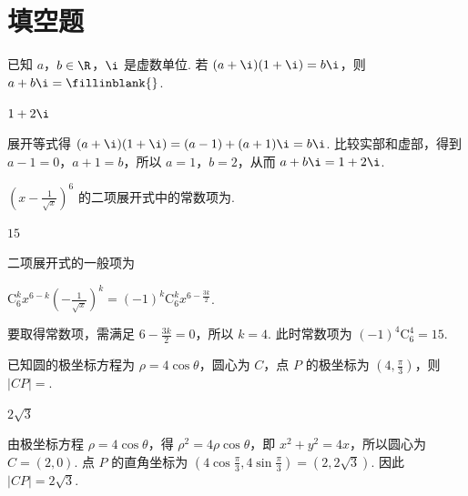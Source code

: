 \section{填空题}

\begin{problem}
已知 \(a\)，\(b\in\R\)，\(\i\) 是虚数单位. 若 \((a + \i)(1 + \i) = b\i\)，则 \(a + b\i =\fillinblank{}\).
\end{problem}

\begin{answer}
\(1+2\i\)
\end{answer}

\begin{solution}
展开等式得 \((a+\i)(1+\i)=(a-1)+(a+1)\i=b\i\). 比较实部和虚部，得到 \(a-1=0\)，\(a+1=b\)，所以 \(a=1\)，\(b=2\)，从而 \(a+b\i=1+2\i\).
\end{solution}

\begin{problem}
\(\left(x - \frac{1}{\sqrt{x}}\right)^6\) 的二项展开式中的常数项为\fillinblank{}.
\end{problem}

\begin{answer}
\(15\)
\end{answer}

\begin{solution}
二项展开式的一般项为

\(\mathrm C_6^k x^{6-k}\left(-\frac{1}{\sqrt{x}}\right)^k=(-1)^k\mathrm C_6^k x^{6-\frac{3k}{2}}\).

要取得常数项，需满足 \(6-\frac{3k}{2}=0\)，所以 \(k=4\). 此时常数项为 \((-1)^4\mathrm C_6^4=15\).
\end{solution}

\begin{problem}
已知圆的极坐标方程为 \(\rho = 4\cos \theta\)，圆心为 \(C\)，点 \(P\) 的极坐标为 \(\left(4, \frac{\pi}{3}\right)\)，则 \(|CP| = \)\fillinblank{}.
\end{problem}

\begin{answer}
\(2\sqrt{3}\)
\end{answer}

\begin{solution}
由极坐标方程 \(\rho=4\cos\theta\)，得 \(\rho^2=4\rho\cos\theta\)，即 \(x^2+y^2=4x\)，所以圆心为 \(C=(2,0)\). 点 \(P\) 的直角坐标为 \(\left(4\cos\frac{\pi}{3},4\sin\frac{\pi}{3}\right)=(2,2\sqrt{3})\). 因此 \(|CP|=2\sqrt{3}\).
\end{solution}

